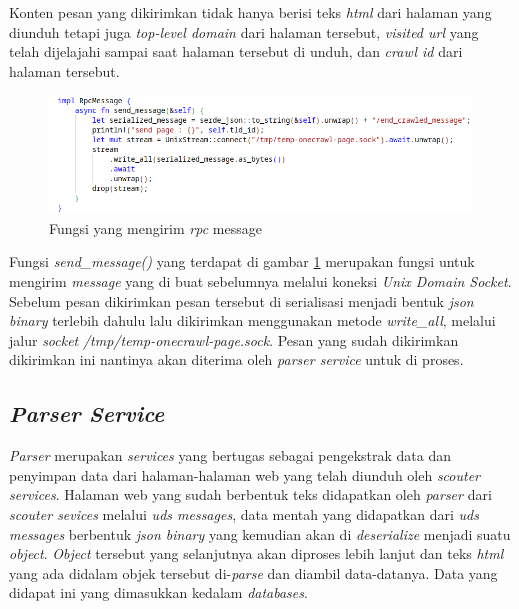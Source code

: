 Konten pesan yang dikirimkan tidak hanya berisi teks \emph{html} dari halaman yang diunduh tetapi juga \emph{top-level domain} dari halaman tersebut, \emph{visited url} yang telah dijelajahi sampai saat halaman tersebut di unduh, dan \emph{crawl id} dari halaman tersebut.

\begin{figure}[H]
  \centering
  \includegraphics[keepaspectratio, width=13cm]{gambar/rpc-send-message-scouter.png}
  \caption{Fungsi yang mengirim \emph{rpc} message}
  \label{gambar:rpc-send-message-scouter}
\end{figure}

Fungsi \emph{send\_message()} yang terdapat di gambar \ref{gambar:rpc-send-message-scouter} merupakan fungsi untuk mengirim \emph{message} yang di buat sebelumnya melalui koneksi \emph{Unix Domain Socket}. Sebelum pesan dikirimkan pesan tersebut di serialisasi menjadi bentuk \emph{json binary} terlebih dahulu lalu dikirimkan menggunakan metode \emph{write\_all}, melalui jalur \emph{socket} \emph{/tmp/temp-onecrawl-page.sock}. Pesan yang sudah dikirimkan dikirimkan ini nantinya akan diterima oleh \emph{parser service} untuk di proses.


\subsection{\emph{Parser Service}}

\emph{Parser} merupakan \emph{services} yang bertugas sebagai pengekstrak data dan penyimpan data dari halaman-halaman web yang telah diunduh oleh \emph{scouter services}. Halaman web yang sudah berbentuk teks didapatkan oleh \emph{parser} dari \emph{scouter sevices} melalui \emph{uds messages}, data mentah yang didapatkan dari \emph{uds messages} berbentuk \emph{json binary} yang kemudian akan di \emph{deserialize} menjadi suatu \emph{object}. \emph{Object} tersebut yang selanjutnya akan diproses lebih lanjut dan teks \emph{html} yang ada didalam objek tersebut di-\emph{parse} dan diambil data-datanya. Data yang didapat ini yang dimasukkan kedalam \emph{databases}.

